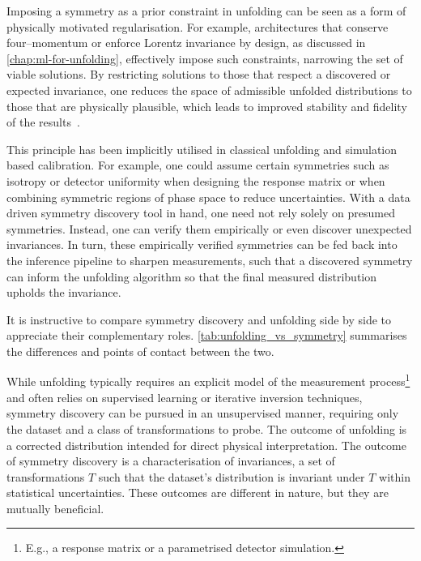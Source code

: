         Imposing a symmetry as a prior constraint in unfolding can be seen as a form of physically motivated regularisation.
        For example, architectures that conserve four--momentum or enforce Lorentz invariance by design, as discussed in \cref{chap:ml-for-unfolding}, effectively impose such constraints, narrowing the set of viable solutions.
        By restricting solutions to those that respect a discovered or expected invariance, one reduces the space of admissible unfolded distributions to those that are physically plausible, which leads to improved stability and fidelity of the results~\cite{Brehmer:2024yqw}.
    
        This principle has been implicitly utilised in classical unfolding and simulation based calibration.
        For example, one could assume certain symmetries such as isotropy or detector uniformity when designing the response matrix or when combining symmetric regions of phase space to reduce uncertainties.
        With a data driven symmetry discovery tool in hand, one need not rely solely on presumed symmetries.
        Instead, one can verify them empirically or even discover unexpected invariances.
        In turn, these empirically verified symmetries can be fed back into the inference pipeline to sharpen measurements, such that a discovered symmetry can inform the unfolding algorithm so that the final measured distribution upholds the invariance.
    
        It is instructive to compare symmetry discovery and unfolding side by side to appreciate their complementary roles.
        \cref{tab:unfolding_vs_symmetry} summarises the differences and points of contact between the two.
    
        While unfolding typically requires an explicit model of the measurement process\footnote{E.g., a response matrix or a parametrised detector simulation.} and often relies on supervised learning or iterative inversion techniques, symmetry discovery can be pursued in an unsupervised manner, requiring only the dataset and a class of transformations to probe.
        The outcome of unfolding is a corrected distribution intended for direct physical interpretation.
        The outcome of symmetry discovery is a characterisation of invariances, a set of transformations $T$ such that the dataset’s distribution is invariant under $T$ within statistical uncertainties.
        These outcomes are different in nature, but they are mutually beneficial.
    
